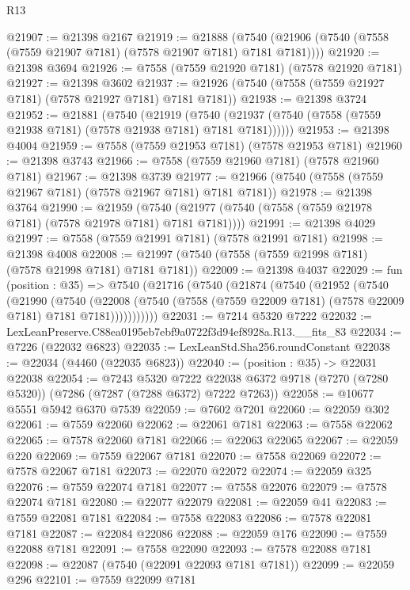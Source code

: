 \begin{lexlean}{R13}
\begin{coremodule}
@21907 := @21398 @2167
@21919 := @21888
    (@7540 (@21906 (@7540 (@7558 (@7559 @21907 @7181) (@7578 @21907 @7181) @7181 @7181))))
@21920 := @21398 @3694
@21926 := @7558 (@7559 @21920 @7181) (@7578 @21920 @7181)
@21927 := @21398 @3602
@21937 := @21926 (@7540 (@7558 (@7559 @21927 @7181) (@7578 @21927 @7181) @7181 @7181))
@21938 := @21398 @3724
@21952 := @21881
    (@7540
      (@21919
        (@7540 (@21937 (@7540 (@7558 (@7559 @21938 @7181) (@7578 @21938 @7181) @7181 @7181))))))
@21953 := @21398 @4004
@21959 := @7558 (@7559 @21953 @7181) (@7578 @21953 @7181)
@21960 := @21398 @3743
@21966 := @7558 (@7559 @21960 @7181) (@7578 @21960 @7181)
@21967 := @21398 @3739
@21977 := @21966 (@7540 (@7558 (@7559 @21967 @7181) (@7578 @21967 @7181) @7181 @7181))
@21978 := @21398 @3764
@21990 := @21959
    (@7540 (@21977 (@7540 (@7558 (@7559 @21978 @7181) (@7578 @21978 @7181) @7181 @7181))))
@21991 := @21398 @4029
@21997 := @7558 (@7559 @21991 @7181) (@7578 @21991 @7181)
@21998 := @21398 @4008
@22008 := @21997 (@7540 (@7558 (@7559 @21998 @7181) (@7578 @21998 @7181) @7181 @7181))
@22009 := @21398 @4037
@22029 := fun (position : @35) =>
  @7540
    (@21716
      (@7540
        (@21874
          (@7540
            (@21952
              (@7540
                (@21990
                  (@7540
                    (@22008
                      (@7540 (@7558 (@7559 @22009 @7181) (@7578 @22009 @7181) @7181 @7181)))))))))))
@22031 := @7214 @5320 @7222
@22032 := LexLeanPreserve.C88ea0195eb7ebf9a0722f3d94ef8928a.R13.__fits_83
@22034 := @7226 (@22032 @6823)
@22035 := LexLeanStd.Sha256.roundConstant
@22038 := @22034 (@4460 (@22035 @6823))
@22040 := (position : @35) -> @22031 @22038
@22054 := @7243
    @5320
    @7222
    @22038
    @6372
    @9718
    (@7270 (@7280 @5320))
    (@7286 (@7287 (@7288 @6372) @7222 @7263))
@22058 := @10677 @5551 @5942 @6370 @7539
@22059 := @7602 @7201
@22060 := @22059 @302
@22061 := @7559 @22060
@22062 := @22061 @7181
@22063 := @7558 @22062
@22065 := @7578 @22060 @7181
@22066 := @22063 @22065
@22067 := @22059 @220
@22069 := @7559 @22067 @7181
@22070 := @7558 @22069
@22072 := @7578 @22067 @7181
@22073 := @22070 @22072
@22074 := @22059 @325
@22076 := @7559 @22074 @7181
@22077 := @7558 @22076
@22079 := @7578 @22074 @7181
@22080 := @22077 @22079
@22081 := @22059 @41
@22083 := @7559 @22081 @7181
@22084 := @7558 @22083
@22086 := @7578 @22081 @7181
@22087 := @22084 @22086
@22088 := @22059 @176
@22090 := @7559 @22088 @7181
@22091 := @7558 @22090
@22093 := @7578 @22088 @7181
@22098 := @22087 (@7540 (@22091 @22093 @7181 @7181))
@22099 := @22059 @296
@22101 := @7559 @22099 @7181

\end{coremodule}
\end{lexlean}
